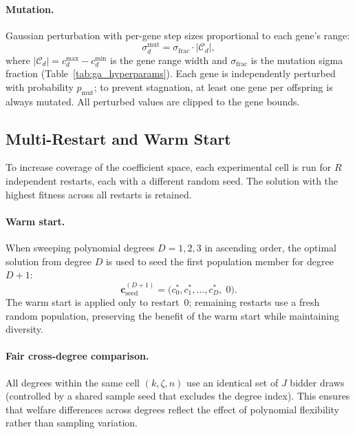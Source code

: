 \documentclass[11pt]{article}
\newcommand{\bsc}{\mathbf{c}}
\begin{document}
\paragraph{Mutation.}
Gaussian perturbation with per-gene step sizes proportional to each gene's range:
\begin{equation}
    \sigma_d^{\text{mut}} = \sigma_{\text{frac}} \cdot |\mathcal{C}_d|,
    \label{eq:mut_sigma}
\end{equation}
where $|\mathcal{C}_d| = c_d^{\max} - c_d^{\min}$ is the gene range width and
$\sigma_{\text{frac}}$ is the mutation sigma fraction (Table~\ref{tab:ga_hyperparams}).
Each gene is independently perturbed with probability $p_{\text{mut}}$; to
prevent stagnation, at least one gene per offspring is always mutated.
All perturbed values are clipped to the gene bounds.

\subsection{Multi-Restart and Warm Start}
\label{sec:restarts}

To increase coverage of the coefficient space, each experimental cell is run for
$R$ independent restarts, each with a different random seed.  The solution with
the highest fitness across all restarts is retained.

\paragraph{Warm start.}
When sweeping polynomial degrees $D = 1, 2, 3$ in ascending order, the optimal
solution from degree $D$ is used to seed the first population member for
degree $D+1$:
\begin{equation}
    \bsc_{\text{seed}}^{(D+1)} = \bigl(c_0^*, c_1^*, \ldots, c_D^*,\; 0\bigr).
    \label{eq:warm_start}
\end{equation}
The warm start is applied only to restart~0; remaining restarts use a fresh
random population, preserving the benefit of the warm start while maintaining
diversity.

\paragraph{Fair cross-degree comparison.}
All degrees within the same cell $(k, \zeta, n)$ use an identical set of $J$
bidder draws (controlled by a shared sample seed that excludes the degree index).
This ensures that welfare differences across degrees reflect the effect of
polynomial flexibility rather than sampling variation.
\end{document}
